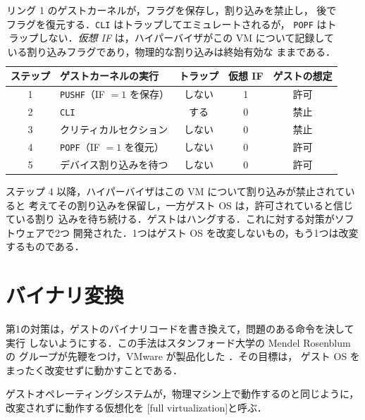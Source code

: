 \documentclass[../main.tex]{subfiles}
\begin{document}
\begin{table}[htbp]
  \centering
  \caption{リング 1 のゲストカーネルが，フラグを保存し，割り込みを禁止し，
    後でフラグを復元する．\texttt{CLI} はトラップしてエミュレートされるが，
    \texttt{POPF} はトラップしない．\emph{仮想 IF} は，ハイパーバイザがこの
    VM について記録している割り込みフラグであり，物理的な割り込みは終始有効な
    ままである．}
  \label{tab:l12-popf}
  \small
  \begin{tabular}{@{}clccc@{}}
    \toprule
    ステップ & ゲストカーネルの実行 & トラップ & 仮想 IF & ゲストの想定 \\
    \midrule
    1 & \texttt{PUSHF}（IF $=1$ を保存）   & しない & 1 & 許可 \\
    2 & \texttt{CLI}                       & する   & 0 & 禁止 \\
    3 & クリティカルセクション             & しない & 0 & 禁止 \\
    4 & \texttt{POPF}（IF $=1$ を復元）     & しない & 0 & 許可 \\
    5 & デバイス割り込みを待つ             & しない & 0 & 許可 \\
    \bottomrule
  \end{tabular}
\end{table}

ステップ 4 以降，ハイパーバイザはこの VM について割り込みが禁止されていると
考えてその割り込みを保留し，一方ゲスト OS は，許可されていると信じている割り
込みを待ち続ける．ゲストはハングする．これに対する対策がソフトウェアで2つ
開発された．1つはゲスト OS を改変しないもの，もう1つは改変するものである．

\section{バイナリ変換}
\label{sec:l12-bt}

第1の対策は，ゲストのバイナリコードを書き換えて，問題のある命令を決して実行
しないようにする．この手法はスタンフォード大学の Mendel Rosenblum の
グループが先鞭をつけ，VMware が製品化した \cite{bugnion2012}．その目標は，
ゲスト OS をまったく改変せずに動かすことである．

\begin{definition}[完全仮想化]
  ゲストオペレーティングシステムが，物理マシン上で動作するのと同じように，
  改変されずに動作する仮想化を
  [full virtualization]と呼ぶ．
\end{definition}
\end{document}

